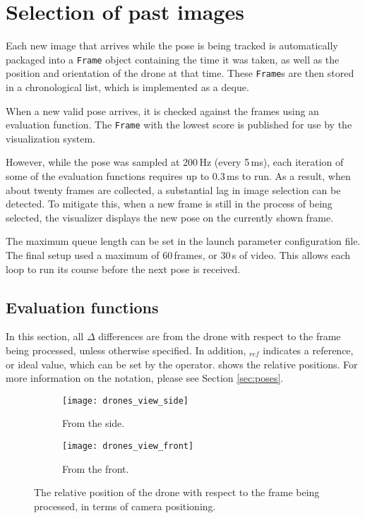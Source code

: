 \chapter{Selection of past images}
    Each new image that arrives while the pose is being tracked is automatically packaged into a \texttt{Frame} object containing the time it was taken, as well as the position and orientation of the drone at that time.
    These \texttt{Frame}s are then stored in a chronological list, which is implemented as a deque.

    When a new valid pose arrives, it is checked against the frames using an evaluation function.
    The \texttt{Frame} with the lowest score is published for use by the visualization system.

    However, while the pose was sampled at 200\,Hz (every 5\,ms), each iteration of some of the evaluation functions requires up to 0.3\,ms to run.
    As a result, when about twenty frames are collected, a substantial lag in image selection can be detected.
    To mitigate this, when a new frame is still in the process of being selected, the visualizer displays the new pose on the currently shown frame.

    The maximum queue length can be set in the launch parameter configuration file.
    The final setup used a maximum of 60\,frames, or 30\,s of video.
    This allows each loop to run its course before the next pose is received.

  \section{Evaluation functions}
    In this section, all $\Delta$ differences are from the drone with respect to the frame being processed, unless otherwise specified.
    In addition, $_{ref}$ indicates a reference, or ideal value, which can be set by the operator.
     shows the relative positions. For more information on the notation, please see Section \ref{sec:poses}.

    \begin{figure}[h]
      \centering
      \begin{subfigure}[b]{0.45\textwidth}
	\texttt{[image: drones\_view\_side]}
	\caption{From the side.}
      \end{subfigure}
      \hfill
      \begin{subfigure}[b]{0.45\textwidth}
	\texttt{[image: drones\_view\_front]}
	\caption{From the front.}
      \end{subfigure}
      \caption[Relative positions]{The relative position of the drone with respect to the frame being processed, in terms of camera positioning.}
      \label{fig:drones_view}
    \end{figure}

